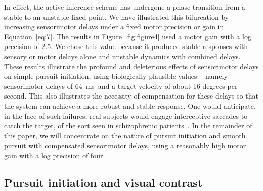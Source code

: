 \documentclass[a4paper]{article} %
\newcommand{\ms}{\si{\milli\second}}%
\begin{document}
In effect, the active inference scheme has undergone a phase transition
from a stable to an unstable fixed point. We have illustrated this
bifurcation by increasing sensorimotor delays under a fixed motor
precision or gain in Equation~\ref{eq:7}. The results in Figure~\ref{fig:figure4} used a motor
gain with a log precision of 2.5. We chose this value because it
produced stable responses with sensory or motor delays alone and
unstable dynamics with combined delays. These results illustrate the
profound and deleterious effects of sensorimotor delays on simple
pursuit initiation, using biologically plausible values -- namely
sensorimotor delays of 64~\ms\ and a target velocity of about 16 degrees per
second. This also illustrates the necessity of compensation for these
delays so that the system can achieve a more robust and stable response.
One would anticipate, in the face of such failures, real subjects would
engage interceptive saccades to catch the target, of the sort seen in
schizophrenic patients~\citep{Levy93}. In the remainder of this
paper, we will concentrate on the nature of pursuit initiation and
smooth pursuit with compensated sensorimotor delays, using a reasonably
high motor gain with a log precision of four.

\subsection{Pursuit initiation and visual contrast}
\end{document}
